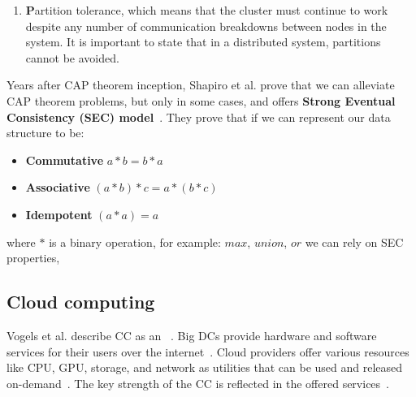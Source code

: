 \begin{enumerate} [start=1,label={(\bfseries \arabic*)}]
	We can calculate availability class if we have system availability $A$, the system's availability class is defined as~\cite{GrayS91}: 
	
	\begin{equation} 
		e^{\log_{10} \frac{1}{ (1 - A)}} 
	\end{equation}
	It is important to notice that even a 99\% available system gives almost four days of downtime in a year, which is unacceptable for services like Facebook, Google, AWS, etc. And when service is down, companies are losing customers.
	\item \textbf{P}artition tolerance, which means that the cluster must continue to work despite any number of communication breakdowns between nodes in the system. It is important to state that in a distributed system, partitions cannot be avoided.
\end{enumerate}

Years after CAP theorem inception, Shapiro et al. prove that we can alleviate CAP theorem problems, but only in some cases, and offers \textbf{Strong Eventual Consistency (SEC) model}~\cite{ShapiroPBZ11}. They prove that if we can represent our data structure to be: \label{crdts}

\begin{itemize}
	\item \textbf{Commutative} $a*b = b*a$ 
	\item \textbf{Associative} $(a*b)*c = a*(b*c)$ 
	\item \textbf{Idempotent} $(a * a) = a$ 
\end{itemize}

\noindent
where $*$ is a binary operation, for example: $max$, $union$, $or$ we can rely on SEC properties,
%
%
\subsection{Cloud computing}\label{sec:cloud_computing}
%
Vogels et al. describe CC as an ~\cite{Vogels}.  Big DCs provide hardware and software services for their users over the internet~\cite{AboveTheCloud}. Cloud providers offer various resources like CPU, GPU, storage, and network as utilities that can be used and released on-demand~\cite{ZhangCB10}. The key strength of the CC is reflected in the offered services~\cite{Vogels}.  

